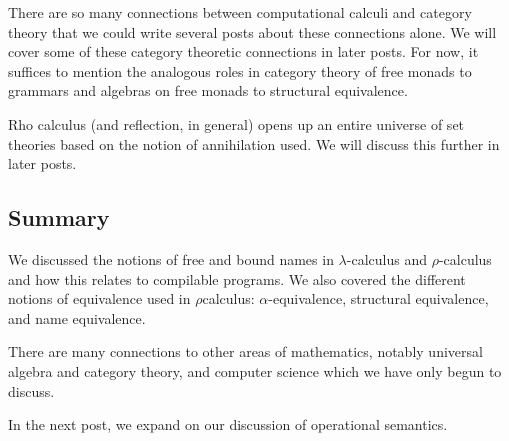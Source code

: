 \documentclass[12pt]{article}
\numberwithin{equation}{section}
\begin{document}
There are so many connections between computational calculi and category theory that we could write several posts about these connections alone. We will cover some of these category theoretic connections in later posts. For now, it suffices to mention the analogous roles in category theory of free monads to grammars and algebras on free monads to structural equivalence. 

Rho calculus (and reflection, in general) opens up an entire universe of set theories based on the notion of annihilation used. We will discuss this further in later posts. \\

\subsection{Summary}
We discussed the notions of free and bound names in $\lambda$-calculus and $\rho$-calculus and how this relates to compilable programs. We also covered the different notions of equivalence used in $\rho$calculus: $\alpha$-equivalence, structural equivalence, and name equivalence.

There are many connections to other areas of mathematics, notably universal algebra and category theory, and computer science which we have only begun to discuss.

In the next post, we expand on our discussion of operational semantics.



\end{document}
